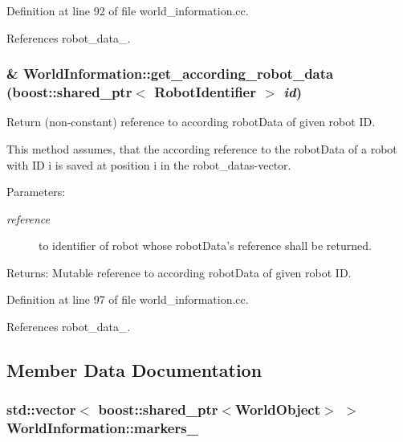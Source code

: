 Definition at line 92 of file world\_\-information.cc.

References robot\_\-data\_\-.\hypertarget{class_world_information_6efbe4425124ac22c322bcdb3aa2c8a0}{
\subsubsection[get\_\-according\_\-robot\_\-data]{ \& WorldInformation::get\_\-according\_\-robot\_\-data (boost::shared\_\-ptr$<$ {\bf RobotIdentifier} $>$ {\em id})}}
\label{class_world_information_6efbe4425124ac22c322bcdb3aa2c8a0}


Return (non-constant) reference to according robotData of given robot ID.

This method assumes, that the according reference to the robotData of a robot with ID i is saved at position i in the robot\_\-datas-vector.

\begin{Desc}
\item[Parameters:]
\begin{description}
\item[{\em reference}]to identifier of robot whose robotData's reference shall be returned. \end{description}
\end{Desc}
\begin{Desc}
\item[Returns:]Mutable reference to according robotData of given robot ID. \end{Desc}


Definition at line 97 of file world\_\-information.cc.

References robot\_\-data\_\-.

\subsection{Member Data Documentation}
\hypertarget{class_world_information_d6fdbbedac7073bf4ae6ca86594e6853}{
\subsubsection[markers\_\-]{\setlength{\rightskip}{0pt plus 5cm}std::vector$<$ boost::shared\_\-ptr$<${\bf WorldObject}$>$ $>$ {\bf WorldInformation::markers\_\-}}}
\label{class_world_information_d6fdbbedac7073bf4ae6ca86594e6853}


